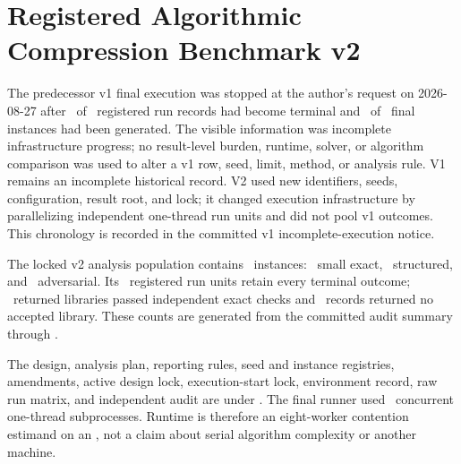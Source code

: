 \section{Registered Algorithmic Compression Benchmark v2}
\label{sec:or-algorithmic-benchmark-v2}

\begin{center}
\end{center}

The predecessor v1 final execution was stopped at the author's request on
2026-08-27 after \AORVOneTerminalRuns\ of \AORVOneRegisteredRuns\ registered
run records had become terminal and \AORVOneGeneratedInstances\ of
\AORVOneRegisteredInstances\ final instances had been generated. The visible
information was incomplete infrastructure progress; no result-level burden,
runtime, solver, or algorithm comparison was used to alter a v1 row, seed,
limit, method, or analysis rule. V1 remains an incomplete historical record.
V2 used new identifiers, seeds, configuration, result root, and lock; it changed
execution infrastructure by parallelizing independent one-thread run units and
did not pool v1 outcomes. This chronology is recorded in the committed v1
incomplete-execution notice.

The locked v2 analysis population contains \AORBenchmarkInstances\ instances:
\AORBenchmarkSmallExact\ small exact, \AORBenchmarkStructured\ structured,
and \AORBenchmarkAdversarial\ adversarial. Its
\AORBenchmarkRuns\ registered run units retain every terminal outcome;
\AORBenchmarkAccepted\ returned libraries passed independent exact checks
and \AORBenchmarkUnsuccessful\ records returned no accepted library. These
counts are generated from the committed audit summary through
.

The design, analysis plan, reporting rules, seed and instance registries,
amendments, active design lock, execution-start lock, environment record, raw
run matrix, and independent audit are under
. The final runner used
\AORWorkerCount\ concurrent one-thread subprocesses. Runtime is therefore an
eight-worker contention estimand on an \AORCPU, not a claim about serial
algorithm complexity or another machine.

